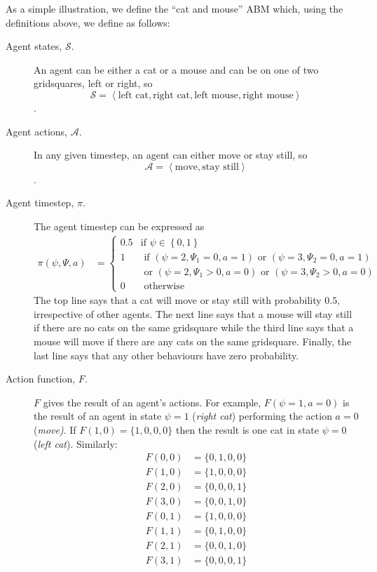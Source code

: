 \documentclass{article}
\begin{document}
As a simple illustration, we define the ``cat and mouse'' ABM which, using the definitions above, we define as follows: 
\begin{description}
	\item[Agent states, $\mathcal{S}$.] An agent can be either a cat or a mouse and can be on one of two gridsquares, left or right, so \[\mathcal{S} = \left<\textrm{left cat}, \textrm{right cat}, \textrm{left mouse}, \textrm{right mouse} \right>\]. 

	\item[Agent actions, $\mathcal{A}$.] In any given timestep, an agent can either move or stay still, so \[\mathcal{A} = \left<\textrm{move}, \textrm{stay still}\right>\].
	

	\item[Agent timestep, $\pi$.] The agent timestep can be expressed as
	\[
	\begin{aligned}
	\pi(\psi, \Psi, a) &=
	\begin{cases}
	0.5 & \text{if } \psi \in \left\{0, 1\right\}\\  %
	1 & \text{ if }(\psi = 2, \Psi_1 = 0, a=1) \text{ or } (\psi=3, \Psi_2 = 0, a=1)\\
	& \text{ or } (\psi = 2, \Psi_1 > 0, a=0) \text{ or } (\psi=3, \Psi_2 > 0, a=0)\\
	0 & \text{ otherwise}
	\end{cases}
	\end{aligned}
	\]
	 The top line says that a cat will move or stay still with probability $0.5$, irrespective of other agents. The next line says that a mouse will stay still if there are no cats on the same gridsquare while the third line says that a mouse will move if there are any cats on the same gridsquare. Finally, the last line says that any other behaviours have zero probability.

\item[Action function, $F$.] $F$ gives the result of an agent's actions. For example, $F(\psi=1, a=0)$ is the result of an agent in state $\psi=1$ (\textit{right cat}) performing the action $a=0$ (\textit{move)}. If $F(1,0) = \{1,0,0,0\}$ then the result is one cat in state $\psi=0$ (\textit{left cat}). Similarly:
\[
\begin{aligned}
F(0, 0) &= \{0,1,0,0\}\\
F(1, 0) &= \{1,0,0,0\}\\
F(2, 0) &= \{0,0,0,1\}\\
F(3, 0) &= \{0,0,1,0\}\\
F(0, 1) &= \{1,0,0,0\}\\
F(1, 1) &= \{0,1,0,0\}\\
F(2, 1) &= \{0,0,1,0\}\\
F(3, 1) &= \{0,0,0,1\}\\
\end{aligned}
\]

\end{description}
\end{document}
